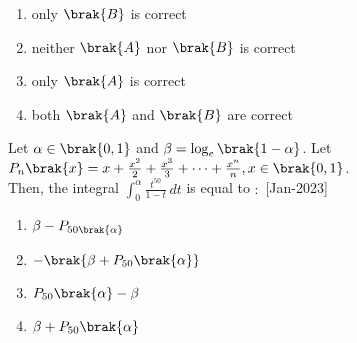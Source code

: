         \begin{enumerate}
            \item only $\brak{B}$ is correct
            \item neither $\brak{A}$ nor $\brak{B}$ is correct
            \item only $\brak{A}$ is correct
            \item both $\brak{A}$ and $\brak{B}$ are correct
        \end{enumerate}
    \item Let $\alpha\in\brak{0,1}$ and $\beta=\log_{e}\brak{1-\alpha}$. Let $P_n\brak{x}=x+\frac{x^2}{2}+\frac{x^3}{3}+\dots+\frac{x^n}{n},x\in\brak{0,1}$.\\
    Then, the integral $\int_{0}^{\alpha}\frac{t^{50}}{1-t} \, dt$ is equal to $\colon$
    \hfill{[Jan-2023]}
        \begin{enumerate}
            \item $\beta-P_{50\brak{\alpha}}$
            \item $-\brak{\beta+P_{50}\brak{\alpha}}$
            \item $P_{50}\brak{\alpha}-\beta$
            \item $\beta+P_{50}\brak{\alpha}$
        \end{enumerate}
